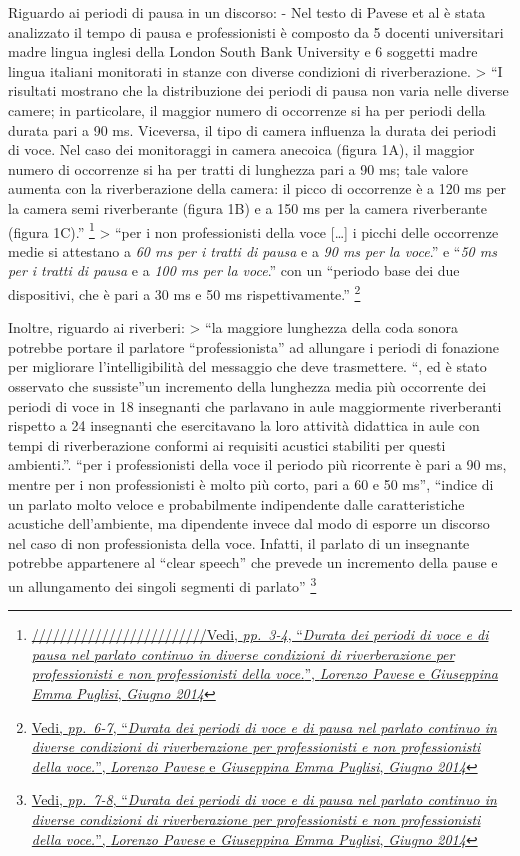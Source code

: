 \documentclass[
]{article}
\begin{document}
Riguardo ai periodi di pausa in un discorso: - Nel testo di Pavese et al è stata analizzato il tempo di pausa e professionisti è composto da 5 docenti universitari madre lingua inglesi della London South Bank University e 6 soggetti madre lingua italiani monitorati in stanze con diverse condizioni di riverberazione. \textgreater{} ``I risultati mostrano che la distribuzione dei periodi di pausa non varia nelle diverse camere; in particolare, il maggior numero di occorrenze si ha per periodi della durata pari a 90 ms. Viceversa, il tipo di camera influenza la durata dei periodi di voce. Nel caso dei monitoraggi in camera anecoica (figura 1A), il maggior numero di occorrenze si ha per tratti di lunghezza pari a 90 ms; tale valore aumenta con la riverberazione della camera: il picco di occorrenze è a 120 ms per la camera semi riverberante (figura 1B) e a 150 ms per la camera riverberante (figura 1C).'' \footnote{\href{DOC/aia2014_pavese_et_al.pdf}{/////////////////////////Vedi, \emph{pp.~3-4}, ``\emph{Durata dei periodi di voce e di pausa nel parlato continuo in diverse condizioni di riverberazione per professionisti e non professionisti della voce.}'', \emph{Lorenzo Pavese} e \emph{Giuseppina Emma Puglisi}, \emph{Giugno 2014}}} \textgreater{} ``per i non professionisti della voce {[}\ldots{]} i picchi delle occorrenze medie si attestano a \emph{60 ms per i tratti di pausa} e a \emph{90 ms per la voce}.'' e ``\emph{50 ms per i tratti di pausa} e a \emph{100 ms per la voce}.'' con un ``periodo base dei due dispositivi, che è pari a 30 ms e 50 ms rispettivamente.'' \footnote{\href{DOC/aia2014_pavese_et_al.pdf}{Vedi, \emph{pp.~6-7}, ``\emph{Durata dei periodi di voce e di pausa nel parlato continuo in diverse condizioni di riverberazione per professionisti e non professionisti della voce.}'', \emph{Lorenzo Pavese} e \emph{Giuseppina Emma Puglisi}, \emph{Giugno 2014}}}

Inoltre, riguardo ai riverberi: \textgreater{} ``la maggiore lunghezza della coda sonora potrebbe portare il parlatore ``professionista'' ad allungare i periodi di fonazione per migliorare l'intelligibilità del messaggio che deve trasmettere. ``, ed è stato osservato che sussiste''un incremento della lunghezza media più occorrente dei periodi di voce in 18 insegnanti che parlavano in aule maggiormente riverberanti rispetto a 24 insegnanti che esercitavano la loro attività didattica in aule con tempi di riverberazione conformi ai requisiti acustici stabiliti per questi ambienti.''. ``per i professionisti della voce il periodo più ricorrente è pari a 90 ms, mentre per i non professionisti è molto più corto, pari a 60 e 50 ms'', ``indice di un parlato molto veloce e probabilmente indipendente dalle caratteristiche acustiche dell'ambiente, ma dipendente invece dal modo di esporre un discorso nel caso di non professionista della voce. Infatti, il parlato di un insegnante potrebbe appartenere al ``clear speech'' che prevede un incremento della pause e un allungamento dei singoli segmenti di parlato'' \footnote{\href{DOC/aia2014_pavese_et_al.pdf}{Vedi, \emph{pp.~7-8}, ``\emph{Durata dei periodi di voce e di pausa nel parlato continuo in diverse condizioni di riverberazione per professionisti e non professionisti della voce.}'', \emph{Lorenzo Pavese} e \emph{Giuseppina Emma Puglisi}, \emph{Giugno 2014}}}
\end{document}
